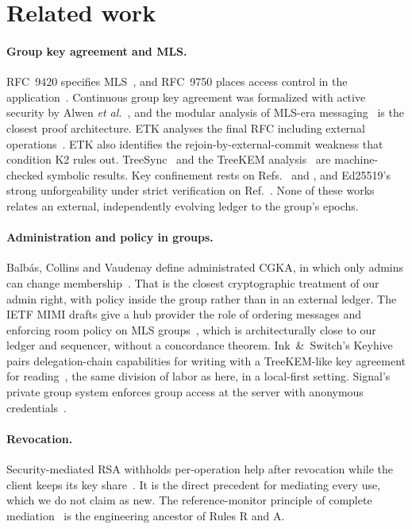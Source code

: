 \documentclass[aps,prx,reprint,superscriptaddress,nofootinbib,floatfix]{revtex4-2}
\theoremstyle{remark}
\begin{document}
\section{Related work}\label{sec:related}

\paragraph*{Group key agreement and MLS.} RFC~9420 specifies MLS~\cite{rfc9420}, and RFC~9750 places access control in the application~\cite{rfc9750}. Continuous group key agreement was formalized with active security by Alwen \emph{et al.}~\cite{active-cgka}, and the modular analysis of MLS-era messaging~\cite{modular-mls} is the closest proof architecture. ETK analyses the final RFC including external operations~\cite{etk}. ETK also identifies the rejoin-by-external-commit weakness that condition K2 rules out. TreeSync~\cite{treesync} and the TreeKEM analysis~\cite{treekem-fstar} are machine-checked symbolic results. Key confinement rests on Refs.~\cite{treekem-fstar} and \cite{etk}, and Ed25519's strong unforgeability under strict verification on Ref.~\cite{ed25519-provable}. None of these works relates an external, independently evolving ledger to the group's epochs.

\paragraph*{Administration and policy in groups.} Balb\'as, Collins and Vaudenay define administrated CGKA, in which only admins can change membership~\cite{acgka}. That is the closest cryptographic treatment of our admin right, with policy inside the group rather than in an external ledger. The IETF MIMI drafts give a hub provider the role of ordering messages and enforcing room policy on MLS groups~\cite{mimi}, which is architecturally close to our ledger and sequencer, without a concordance theorem. Ink~\&~Switch's Keyhive pairs delegation-chain capabilities for writing with a TreeKEM-like key agreement for reading~\cite{keyhive}, the same division of labor as here, in a local-first setting. Signal's private group system enforces group access at the server with anonymous credentials~\cite{signal-pgs}.

\paragraph*{Revocation.} Security-mediated RSA withholds per-operation help after revocation while the client keeps its key share~\cite{sem}. It is the direct precedent for mediating every use, which we do not claim as new. The reference-monitor principle of complete mediation~\cite{anderson} is the engineering ancestor of Rules R and A.
\end{document}
